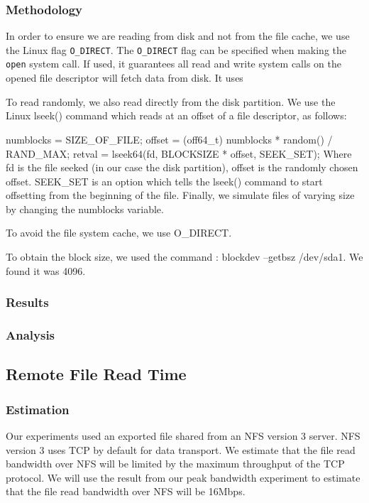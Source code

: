 \subsubsection{Methodology}

In order to ensure we are reading from disk and not from the file cache, we use the Linux flag \texttt{O\_DIRECT}. The \texttt{O\_DIRECT} flag can be specified when making the \texttt{open} system call. If used, it guarantees all read and write system calls on the opened file descriptor will fetch data from disk. It uses 

To read randomly, we also read directly from the disk partition. We use the Linux lseek() command which reads at an offset of a file descriptor, as follows:

numblocks = SIZE_OF_FILE;
offset = (off64_t) numblocks * random() / RAND_MAX;
retval = lseek64(fd, BLOCKSIZE * offset, SEEK_SET);
Where fd is the file seeked (in our case the disk partition), offset is the randomly chosen offset. SEEK_SET is an option which tells the lseek() command to start offsetting from the beginning of the file. Finally, we simulate files of varying size by changing the numblocks variable.

To avoid the file system cache, we use O_DIRECT.

To obtain the block size, we used the command : blockdev --getbsz /dev/sda1. We found it was 4096.

\subsubsection{Results}


\subsubsection{Analysis}

\subsection{Remote File Read Time}

\subsubsection{Estimation}

Our experiments used an exported file shared from an NFS version 3 server. NFS
version 3 uses TCP by default for data transport.  We estimate that the file
read bandwidth over NFS will be limited by the maximum throughput of the TCP
protocol. We will use the result from our peak bandwidth experiment to estimate 
that the file read bandwidth over NFS will be 16Mbps.


